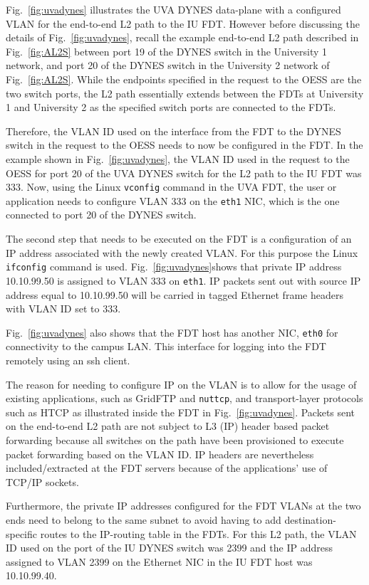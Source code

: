 Fig.~\ref{fig:uvadynes} illustrates the UVA DYNES data-plane with a configured VLAN for the end-to-end L2 path to the IU FDT.
However before discussing the details of Fig.~\ref{fig:uvadynes}, recall the example end-to-end L2 path described in Fig.~\ref{fig:AL2S} between
port 19 of the DYNES switch in the University 1 network,
and port 20 of the DYNES switch in the University 2 network of Fig.~\ref{fig:AL2S}. While the endpoints specified in the request
to the OESS are the two switch ports, the L2 path essentially
extends between the FDTs at University 1 and University 2
as the specified switch ports are connected to the FDTs.

Therefore, the VLAN ID used on the interface from the FDT
to the DYNES switch in the request to the OESS needs to
now be configured in the FDT. In the example shown in
Fig.~\ref{fig:uvadynes}, the VLAN ID used in the request to the OESS for
port 20 of the UVA DYNES switch for the L2 path to the
IU FDT was 333. Now, using the Linux \texttt{vconfig} command
in the UVA FDT, the user or application needs to configure
VLAN 333 on the \texttt{eth1} NIC, which is the one connected to
port 20 of the DYNES switch.

The second step that needs to be executed on the FDT is a
configuration of an IP address associated with the newly created VLAN. For this purpose the Linux \texttt{ifconfig} command
is used. Fig.~\ref{fig:uvadynes}shows that private IP address 10.10.99.50
is assigned to VLAN 333 on \texttt{eth1}. IP packets sent out
with source IP address equal to 10.10.99.50 will be carried
in tagged Ethernet frame headers with VLAN ID set to 333.

Fig.~\ref{fig:uvadynes} also shows that the FDT host has another NIC, \texttt{eth0}
for connectivity to the campus LAN. This interface for logging into the FDT remotely using an ssh client.

The reason for needing to configure IP on the VLAN is to allow for the usage of existing applications, such as GridFTP
and \texttt{nuttcp}, and transport-layer protocols such as HTCP \cite{HTCP}
as illustrated inside the FDT in Fig.~\ref{fig:uvadynes}. Packets sent on the
end-to-end L2 path are not subject to L3 (IP) header based
packet forwarding because all switches on the path have
been provisioned to execute packet forwarding based on the
VLAN ID. IP headers are nevertheless included/extracted at
the FDT servers because of the applications' use of TCP/IP
sockets.

Furthermore, the private IP addresses configured for the
FDT VLANs at the two ends need to belong to the same
subnet to avoid having to add destination-specific routes to
the IP-routing table in the FDTs. For this L2 path, the
VLAN ID used on the port of the IU DYNES switch was
2399 and the IP address assigned to VLAN 2399 on the
Ethernet NIC in the IU FDT host was 10.10.99.40.

